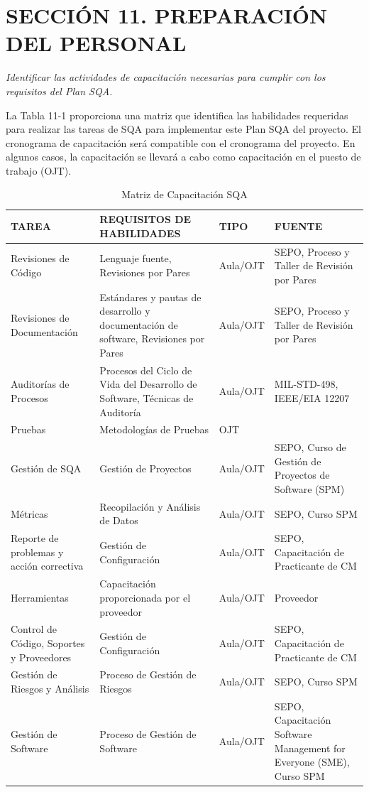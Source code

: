 \section{SECCIÓN 11. PREPARACIÓN DEL PERSONAL}
\textit{Identificar las actividades de capacitación necesarias para cumplir con los requisitos del Plan SQA.}

La Tabla 11-1 proporciona una matriz que identifica las habilidades requeridas para realizar las tareas de SQA para implementar este Plan SQA del proyecto. El cronograma de capacitación será compatible con el cronograma del proyecto. En algunos casos, la capacitación se llevará a cabo como capacitación en el puesto de trabajo (OJT).

\begin{table}[H]
\centering
\caption{Matriz de Capacitación SQA}
\label{tab:training}
\begin{tabular}{|p{4cm}|p{4cm}|p{2.5cm}|p{3.5cm}|}
\hline
\textbf{TAREA} & \textbf{REQUISITOS DE HABILIDADES} & \textbf{TIPO} & \textbf{FUENTE} \\
\hline
Revisiones de Código & Lenguaje fuente, Revisiones por Pares & Aula/OJT & SEPO, Proceso y Taller de Revisión por Pares \\
\hline
Revisiones de Documentación & Estándares y pautas de desarrollo y documentación de software, Revisiones por Pares & Aula/OJT & SEPO, Proceso y Taller de Revisión por Pares \\
\hline
Auditorías de Procesos & Procesos del Ciclo de Vida del Desarrollo de Software, Técnicas de Auditoría & Aula/OJT & MIL-STD-498, IEEE/EIA 12207 \\
\hline
Pruebas & Metodologías de Pruebas & OJT & \\
\hline
Gestión de SQA & Gestión de Proyectos & Aula/OJT & SEPO, Curso de Gestión de Proyectos de Software (SPM) \\
\hline
Métricas & Recopilación y Análisis de Datos & Aula/OJT & SEPO, Curso SPM \\
\hline
Reporte de problemas y acción correctiva & Gestión de Configuración & Aula/OJT & SEPO, Capacitación de Practicante de CM \\
\hline
Herramientas & Capacitación proporcionada por el proveedor & Aula/OJT & Proveedor \\
\hline
Control de Código, Soportes y Proveedores & Gestión de Configuración & Aula/OJT & SEPO, Capacitación de Practicante de CM \\
\hline
Gestión de Riesgos y Análisis & Proceso de Gestión de Riesgos & Aula/OJT & SEPO, Curso SPM \\
\hline
Gestión de Software & Proceso de Gestión de Software & Aula/OJT & SEPO, Capacitación Software Management for Everyone (SME), Curso SPM \\
\hline
\end{tabular}
\end{table}